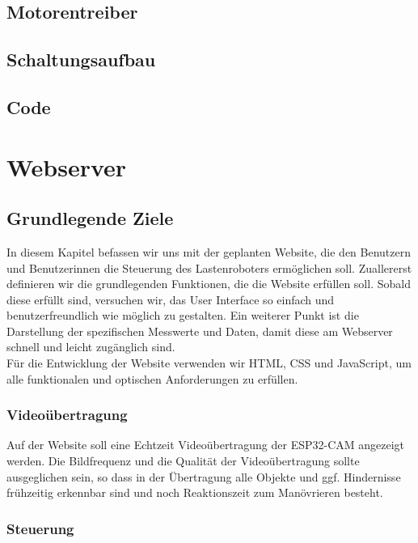 \documentclass[ngerman,12pt,a4paper]{article}
\begin{document}
		\subsection{Motorentreiber} %
		
		\subsection{Schaltungsaufbau} %
		
		\subsection{Code} %
	
	\section{Webserver} %
	 
		\subsection{Grundlegende Ziele}
	In diesem Kapitel befassen wir uns mit der geplanten Website, die den Benutzern und Benutzerinnen die Steuerung des Lastenroboters ermöglichen soll. Zuallererst definieren wir die grundlegenden Funktionen, die die Website erfüllen soll. Sobald diese erfüllt sind, versuchen wir, das User Interface so einfach und benutzerfreundlich wie möglich zu gestalten. Ein weiterer Punkt ist die Darstellung der spezifischen Messwerte und Daten, damit diese am Webserver schnell und leicht zugänglich sind.\\[0.5cm]
	Für die Entwicklung der Website verwenden wir HTML, CSS und JavaScript, um alle funktionalen und optischen Anforderungen zu erfüllen.  
	
			\subsubsection*{Videoübertragung} 	 
	
	Auf der Website soll eine Echtzeit Videoübertragung der ESP32-CAM angezeigt werden. Die Bildfrequenz und die Qualität der Videoübertragung sollte ausgeglichen sein, so dass in der Übertragung alle Objekte und ggf. Hindernisse frühzeitig erkennbar sind und noch Reaktionszeit zum Manövrieren besteht. 
	
			\subsubsection*{Steuerung}
	
\end{document}
